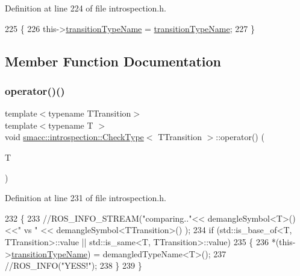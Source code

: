 Definition at line 224 of file introspection.\+h.


\begin{DoxyCode}
225     \{
226         this->\hyperlink{structsmacc_1_1introspection_1_1CheckType_a0b356fd5975fa8f359f4e47f9ac8debf}{transitionTypeName} = \hyperlink{structsmacc_1_1introspection_1_1CheckType_a0b356fd5975fa8f359f4e47f9ac8debf}{transitionTypeName};
227     \}
\end{DoxyCode}


\subsection{Member Function Documentation}
\mbox{\label{structsmacc_1_1introspection_1_1CheckType_abdf8cd065f31c69615c91af287192b9a}} 
\subsubsection{\texorpdfstring{operator()()}{operator()()}}
{\footnotesize\ttfamily template$<$typename T\+Transition$>$ \\
template$<$typename T $>$ \\
void \hyperlink{structsmacc_1_1introspection_1_1CheckType}{smacc\+::introspection\+::\+Check\+Type}$<$ T\+Transition $>$\+::operator() (\begin{DoxyParamCaption}\item[{T}]{ }\end{DoxyParamCaption})\hspace{0.3cm}{\ttfamily [inline]}}



Definition at line 231 of file introspection.\+h.


\begin{DoxyCode}
232     \{
233         \textcolor{comment}{//ROS\_INFO\_STREAM("comparing.."<< demangleSymbol<T>() <<" vs " << demangleSymbol<TTransition>() );}
234         \textcolor{keywordflow}{if} (std::is\_base\_of<T, TTransition>::value || std::is\_same<T, TTransition>::value)
235         \{
236             *(this->\hyperlink{structsmacc_1_1introspection_1_1CheckType_a0b356fd5975fa8f359f4e47f9ac8debf}{transitionTypeName}) = demangledTypeName<T>();
237             \textcolor{comment}{//ROS\_INFO("YESS!");}
238         \}
239     \}
\end{DoxyCode}


